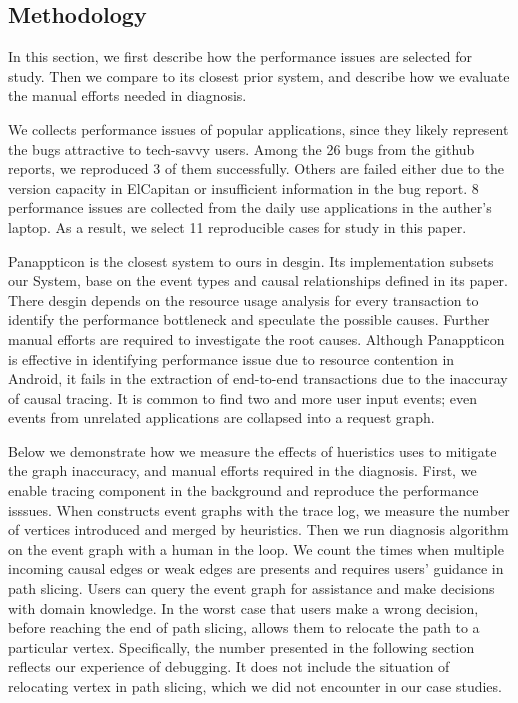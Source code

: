 \subsection{Methodology} \label{sec:methodology}

In this section, we first describe how the performance issues are selected for
study. Then we compare \xxx to its closest prior system, and describe how we
evaluate the manual efforts needed in diagnosis.

We collects performance issues of popular applications, since they likely
represent the bugs attractive to tech-savvy users.  Among the 26 bugs from the
github reports, we reproduced 3 of them successfully.  Others are failed either
due to the version capacity in ElCapitan or insufficient information in the bug
report.  8 performance issues are collected from the daily use applications in
the auther's laptop.  As a result, we select 11 reproducible cases for study in
this paper.


Panappticon is the closest system to ours in desgin.  Its implementation
subsets our \xxx System, base on the event types and causal relationships
defined in its paper.  There desgin depends on the resource usage analysis for
every transaction to identify the performance bottleneck and speculate the
possible causes. Further manual efforts are required to investigate the root
causes. Although Panappticon is effective in identifying performance issue due
to resource contention in Android, it fails in the extraction of end-to-end
transactions due to the inaccuray of causal tracing.
It is common to find two and more user input events; even events from unrelated
applications are collapsed into a request graph.

Below we demonstrate how we measure the effects of hueristics \xxx uses to
mitigate the graph inaccuracy, and manual efforts required in the diagnosis.
First, we enable tracing component in the background and reproduce the
performance isssues.  When \xxx constructs event graphs with the trace log, we
measure the number of vertices introduced and merged by heuristics.  Then we
run \xxx diagnosis algorithm on the event graph with a human in the loop. We
count the times when multiple incoming causal edges or weak edges are presents
and \xxx requires users' guidance in path slicing. Users can query the event
graph for assistance and make decisions with domain knowledge. In the worst
case that users make a wrong decision, before reaching the end of path slicing,
\xxx allows them to relocate the path to a particular vertex. Specifically, the
number presented in the following section reflects our experience of debugging.
It does not include the situation of relocating vertex in path slicing, which
we did not encounter in our case studies.
